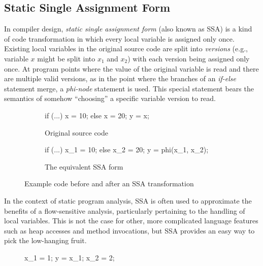 \subsection{Static Single Assignment Form}

In compiler design, \emph{static single assignment form} (also known as SSA) is
a kind of code transformation in which every local variable is assigned only
once. Existing local variables in the original source code are split into
\emph{versions} (e.g., variable $x$ might be split into $x_1$ and $x_2$) with
each version being assigned only once. At program points where the value of the
original variable is read and there are multiple valid versions, as in the
point where the branches of an \emph{if-else} statement merge, a
\emph{phi-node} statement is used. This special statement bears the semantics
of somehow ``choosing'' a specific variable version to read.

\begin{figure}[h]
\begin{subfigure}{.45\textwidth}
    \begin{javacode}
    if (...) x = 10;
    else x = 20;
    y = x;
    \end{javacode}
    \caption{Original source code}
\end{subfigure}%
\hfill
\begin{subfigure}{.45\textwidth}
    \begin{javacode}
    if (...) x_1 = 10;
    else x_2 = 20;
    y = phi(x_1, x_2);
    \end{javacode}
    \caption{The equivalent SSA form}
\end{subfigure}
\caption{Example code before and after an SSA transformation}
\end{figure}

In the context of static program analysis, SSA is often used to approximate the
benefits of a flow-sensitive analysis, particularly pertaining to the handling
of local variables. This is not the case for other, more complicated language
features such as heap accesses and method invocations, but SSA provides an easy
way to pick the low-hanging fruit.

\setlength\intextsep{10pt}
\begin{figure}
    \centering
\begin{javacodeNoLines}
x_1 = 1;
y = x_1;
x_2 = 2;
\end{javacodeNoLines}
\end{figure}

